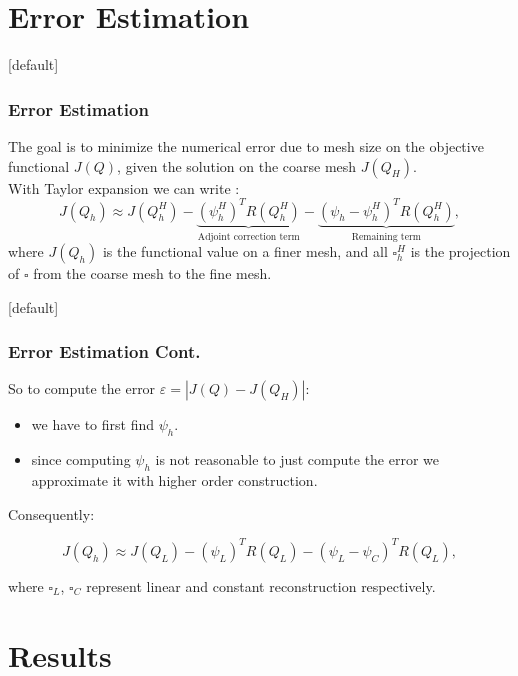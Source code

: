 \documentclass{beamer}
\makeatletter
\newenvironment{withoutheadline}{
        \setbeamertemplate{headline}[default]
        \def\beamer@entrycode{\vspace*{-\headheight}}
    }{}
\makeatother
\begin{document}
\section{Error Estimation}
\begin{withoutheadline}
\begin{frame}\frametitle{Error Estimation} 
The goal is to minimize the numerical error due to mesh size on the objective functional $ J(Q) $, given the solution on the coarse mesh $ J(Q_H) $.\\
With Taylor expansion we can write
:
\begin{displaymath}
J(Q_h) \approx  J(Q^H_h) - \underbrace{(\psi^H_h)^T R(Q^H_h)}_\text{Adjoint correction term} - 
\underbrace{(\psi_h - \psi^H_h)^T R(Q^H_h)}_\text{Remaining term},
\end{displaymath}
where $ J(Q_h) $ is the functional value on a finer mesh, and all $\square^H_h$ is the projection of $\square$ from the coarse mesh to the fine mesh.
\end{frame}
\end{withoutheadline}
\begin{withoutheadline}
\begin{frame}\frametitle{Error Estimation Cont.} 
So to compute the error $ \varepsilon = |J(Q) - J(Q_H)| $:
\begin{itemize}
\item we have to first find $\psi_h$.
\item since computing $\psi_h$ is not reasonable to just compute the error we approximate it with higher order construction.
\end{itemize}
Consequently:

\begin{displaymath}
J(Q_h) \approx  J(Q_L) - (\psi_L)^T R(Q_L) - (\psi_L - \psi_C)^T R(Q_L),
\end{displaymath}

where $\square_L$, $\square_C$ represent linear and constant reconstruction respectively.

\end{frame}
\end{withoutheadline}
\section{Results}
\end{document}

